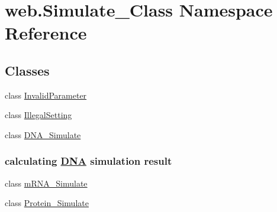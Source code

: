 \hypertarget{namespaceweb_1_1_simulate___class}{\section{web.\-Simulate\-\_\-\-Class Namespace Reference}
\label{namespaceweb_1_1_simulate___class}
}
\subsection*{Classes}
\begin{DoxyCompactItemize}
\item 
class \hyperlink{classweb_1_1_simulate___class_1_1_invalid_parameter}{Invalid\-Parameter}
\item 
class \hyperlink{classweb_1_1_simulate___class_1_1_illegal_setting}{Illegal\-Setting}
\item 
class \hyperlink{classweb_1_1_simulate___class_1_1_d_n_a___simulate}{D\-N\-A\-\_\-\-Simulate}
\begin{DoxyCompactList}\small\item\em \subsubsection*{calculating \hyperlink{class_d_n_a}{D\-N\-A} simulation result }\end{DoxyCompactList}\item 
class \hyperlink{classweb_1_1_simulate___class_1_1m_r_n_a___simulate}{m\-R\-N\-A\-\_\-\-Simulate}
\item 
class \hyperlink{classweb_1_1_simulate___class_1_1_protein___simulate}{Protein\-\_\-\-Simulate}
\end{DoxyCompactItemize}



